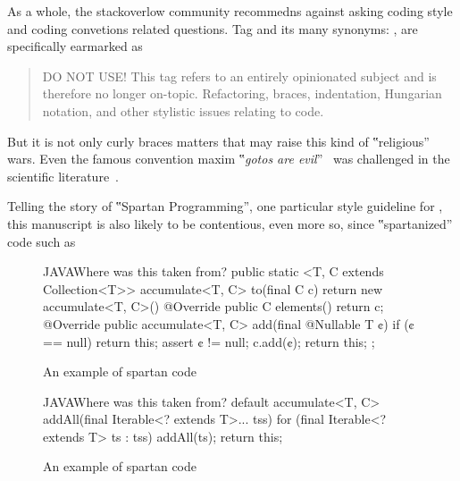 As a whole, the stackoverlow community
recommedns against asking coding style and coding convetions related questions.
Tag  and its many synonyms: ,
 are specifically
earmarked as
\begin{quote}
DO NOT USE! This tag refers to an entirely opinionated subject and is therefore
no longer on-topic. Refactoring, braces, indentation, Hungarian notation, and
other stylistic issues relating to code.
\end{quote}
But it is not only curly braces matters that may raise
this kind of ‟religious” wars. Even the famous convention maxim ‟\emph{gotos
are evil}”~\cite{Dijksta:must be in bib} was challenged in the scientific
literature~\cite{Knuth: and there are several others}.

Telling the story of ‟Spartan Programming”, one particular style guideline for
\Java, this manuscript is also likely to be contentious, even more so, since
‟spartanized” code such as

\begin{figure}[h]
  \begin{Code}{JAVA}{Where was this taken from?}
public 
  static <T, C extends Collection<T>>
    accumulate<T, C> to(final C c) {
      return new accumulate<T, C>() {
        @Override public C elements() {
          return c;
        }
        @Override public accumulate<T, C> 
          add(final @Nullable T ¢) {
            if (¢ == null)
              return this;
            assert ¢ != null;
            c.add(¢);
            return this;
          }
      };
  }
\end{Code}
\label{figure:shock}
\caption{An example of spartan code}
\end{figure}

\begin{figure}[h]
\begin{Code}{JAVA}{Where was this taken from?}
default accumulate<T, C> addAll(final Iterable<? extends T>... tss) {
  for (final Iterable<? extends T> ts : tss)
    addAll(ts);
  return this;
}
\end{Code}
\label{figure:shock-2}
\caption{An example of spartan code}
\end{figure}

